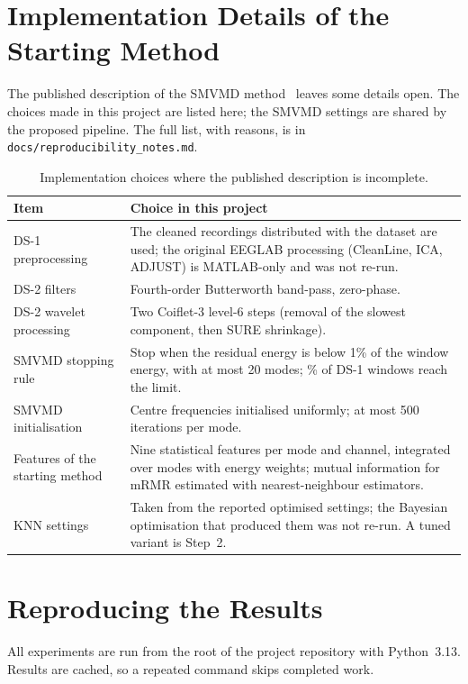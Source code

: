 \chapter{Implementation Details of the Starting Method}
\thispagestyle{empty}
The published description of the SMVMD method~\cite{chandela2025} leaves some details open. The
choices made in this project are listed here; the SMVMD settings are shared by the proposed
pipeline. The full list, with reasons, is in \texttt{docs/reproducibility\_notes.md}.

\begin{table}[H]
\caption{Implementation choices where the published description is incomplete.}
\label{tab:choices}\centering\small
\begin{tabular}{p{4.2cm}p{9.6cm}}
\hline
Item & Choice in this project \\
\hline
DS-1 preprocessing & The cleaned recordings distributed with the dataset are used; the
original EEGLAB processing (CleanLine, ICA, ADJUST) is MATLAB-only and was not re-run. \\
DS-2 filters & Fourth-order Butterworth band-pass, zero-phase. \\
DS-2 wavelet processing & Two Coiflet-3 level-6 steps (removal of the slowest component, then
SURE shrinkage). \\
SMVMD stopping rule & Stop when the residual energy is below 1\% of the window energy, with at
most 20 modes; \R{DSoneModesCapPct}\% of DS-1 windows reach the limit. \\
SMVMD initialisation & Centre frequencies initialised uniformly; at most 500 iterations per
mode. \\
Features of the starting method & Nine statistical features per mode and channel, integrated
over modes with energy weights; mutual information for mRMR estimated with nearest-neighbour
estimators. \\
KNN settings & Taken from the reported optimised settings; the Bayesian optimisation that
produced them was not re-run. A tuned variant is Step~2. \\
\hline
\end{tabular}
\end{table}

\chapter{Reproducing the Results}
\thispagestyle{empty}
All experiments are run from the root of the project repository with Python~3.13. Results are
cached, so a repeated command skips completed work.


